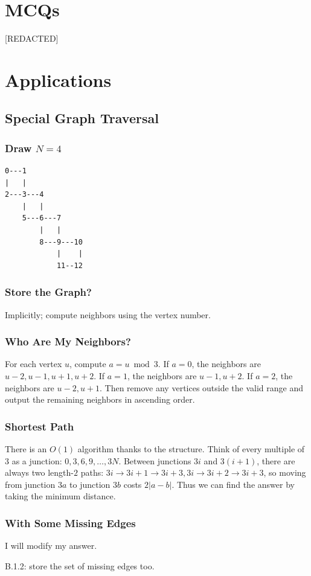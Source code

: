 \documentclass[12pt]{article}
\begin{document}
\section{MCQs}
[REDACTED]
\section{Applications}
\subsection{Special Graph Traversal}
\subsubsection{Draw $N=4$}
\begin{verbatim}
0---1
|   |
2---3---4
    |   |
    5---6---7
        |   |
        8---9---10
            |    |
            11--12
\end{verbatim}
\subsubsection{Store the Graph?}
Implicitly; compute neighbors using the vertex number.
\subsubsection{Who Are My Neighbors?}
For each vertex $u$, compute $a=u\bmod 3$. If $a=0$, the neighbors are $u-2, u-1, u+1, u+2$. If $a=1$, the neighbors are $u-1, u+2$. If $a=2$, the neighbors are $u-2, u+1$. Then remove any vertices outside the valid range and output the remaining neighbors in ascending order.
\subsubsection{Shortest Path}
There is an $O(1)$ algorithm thanks to the structure. Think of every multiple of $3$ as a junction: $0, 3, 6, 9, \dots, 3N$. Between junctions $3i$ and $3(i+1)$, there are always two length-$2$ paths: $3i\to 3i+1\to 3i+3, 3i\to 3i+2\to 3i+3$, so moving from junction $3a$ to junction $3b$ costs $2\lvert a-b\rvert$. Thus we can find the answer by taking the minimum distance.
\subsubsection{With Some Missing Edges}
I will modify my answer.

B.1.2: store the set of missing edges too.
\end{document}
